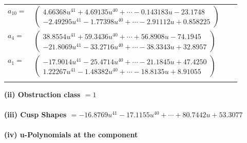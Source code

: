 \documentclass[1p]{elsarticle_modified}
\theoremstyle{definition}
\begin{document}
\begin{tabular}{m{7pt} m{180pt} m{7pt} m{180pt} }
\flushright $a_{10}=$&$\begin{pmatrix}4.66368 u^{41}+4.69135 u^{40}+\cdots-0.143183 u-23.1748\\-2.49295 u^{41}-1.77398 u^{40}+\cdots-2.91112 u+0.858225\end{pmatrix}$ \\
\flushright $a_{4}=$&$\begin{pmatrix}38.8554 u^{41}+59.3436 u^{40}+\cdots+56.8908 u-74.1945\\-21.8069 u^{41}-33.2716 u^{40}+\cdots-38.3343 u+32.8957\end{pmatrix}$ \\
\flushright $a_{1}=$&$\begin{pmatrix}-17.9014 u^{41}-25.4714 u^{40}+\cdots-21.1845 u+47.4250\\1.22267 u^{41}-1.48382 u^{40}+\cdots-18.8135 u+8.91055\end{pmatrix}$\\&\end{tabular}
\flushleft \textbf{(ii) Obstruction class $= 1$}\\~\\
\flushleft \textbf{(iii) Cusp Shapes $= -16.8769 u^{41}-17.1155 u^{40}+\cdots+80.7442 u+53.3077$}\\~\\
\newpage\renewcommand{\arraystretch}{1}
\flushleft \textbf{(iv) u-Polynomials at the component}\newline \\
\end{document}
